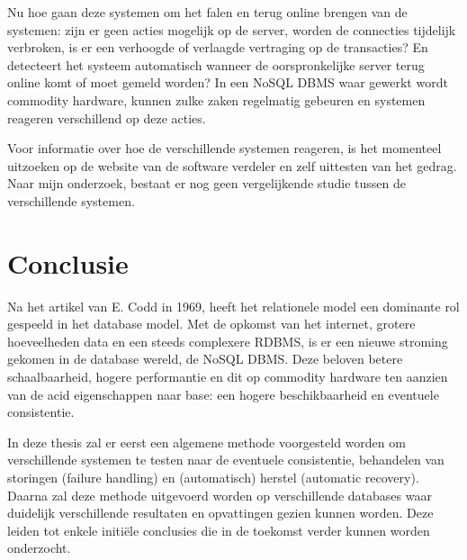 Nu hoe gaan deze systemen om het falen en terug online brengen van de systemen: zijn er geen acties mogelijk op de server, worden de connecties tijdelijk verbroken, is er een verhoogde of verlaagde vertraging op de transacties? En detecteert het systeem automatisch wanneer de oorspronkelijke server terug online komt of moet gemeld worden? In een NoSQL DBMS waar gewerkt wordt commodity hardware, kunnen zulke zaken regelmatig gebeuren en systemen reageren verschillend op deze acties. 

Voor informatie over hoe de verschillende systemen reageren, is het momenteel uitzoeken op de website van de software verdeler en zelf uittesten van het gedrag. Naar mijn onderzoek, bestaat er nog geen vergelijkende studie tussen de verschillende systemen. 

\section{Conclusie}
Na het artikel van E. Codd \cite{Codd:1970:RMD:362384.362685} in 1969, heeft het relationele model een dominante rol gespeeld in het database model. Met de opkomst van het internet, grotere hoeveelheden data en een steeds complexere RDBMS, is er een nieuwe stroming gekomen in de database wereld, de NoSQL DBMS. Deze beloven betere schaalbaarheid, hogere performantie en dit op commodity hardware ten aanzien van de \gls{acid} eigenschappen naar \gls{base}: een hogere beschikbaarheid en eventuele consistentie.  

In deze thesis zal er eerst een algemene methode voorgesteld worden om verschillende systemen te testen naar de eventuele consistentie, behandelen van storingen (failure handling) en (automatisch) herstel (automatic recovery).  \\
Daarna zal deze methode uitgevoerd worden op verschillende databases waar duidelijk verschillende resultaten en opvattingen gezien kunnen worden. Deze leiden tot enkele initiële conclusies die in de toekomst verder kunnen worden onderzocht. 